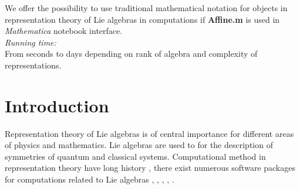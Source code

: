 \documentclass[preprint,12pt]{elsarticle}
\begin{document}
\begin{small}
We offer the possibility to use traditional mathematical notation for objects in representation theory of Lie algebras in computations if {\bf Affine.m} is used in {\it Mathematica} notebook interface. 
   \\
{\em Running time:}\\
From seconds to days depending on rank of algebra and complexity of representations.
   \\

\end{small}


\section{Introduction}
\label{intro}

Representation theory of Lie algebras is of central importance for different areas of physics and mathematics. Lie algebras are used to for the description of symmetries of quantum and classical systems. Computational method in representation theory have long history \cite{belinfante1989survey}, there exist numerous software packages for computations related to Lie algebras \cite{simplie}, \cite{vanleeuwen1994lsp}, \cite{stembridge1995mps,coxweyl}, \cite{fischbacher2002ilp}, \cite{Fuchs:1996dd}. 
\end{document}
